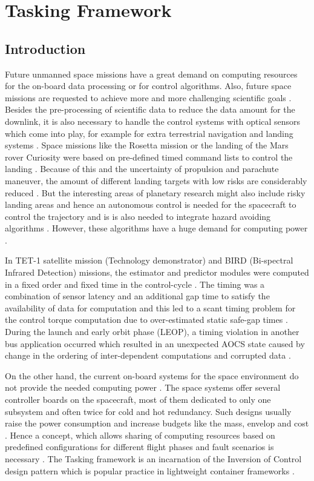 
\chapter{Tasking Framework}
\section{Introduction}
Future unmanned space missions have a great demand on computing resources for the on-board data processing or for control algorithms. Also, future space missions are requested to achieve more and more challenging scientific goals \cite{PhdThesis}. Besides the pre-processing of scientific data to reduce the data amount for the downlink, it is also necessary to handle the control systems with optical sensors which come into play, for example for extra terrestrial navigation and landing systems \cite{ATON}. Space missions like the Rosetta mission or the landing of the Mars rover Curiosity were based on pre-defined timed command lists to control the landing \cite{TaskFr}. Because of this and the uncertainty of propulsion and parachute maneuver, the amount of different landing targets with low risks are considerably reduced \cite{TaskFr}. But the interesting areas of planetary research might also include risky landing areas and hence an autonomous control is needed for the spacecraft to control the trajectory and is is also needed to integrate hazard avoiding algorithms \cite{ATON}. However, these algorithms have a huge demand for computing power \cite{TaskFr}. 

In TET-1 satellite mission (Technology demonstrator) and BIRD (Bi-spectral Infrared Detection) missions, the estimator and predictor modules were computed in a fixed order and fixed time in the control-cycle \cite{TETBIRD}. The timing was a combination of sensor latency and an additional gap time to satisfy the availability of data for computation and this led to a scant timing problem for the control torque computation due to over-estimated static safe-gap times \cite{TETBIRD,TETtoEUCROPIS}. During the launch and early orbit phase (LEOP), a timing violation in another bus application occurred which resulted in an unexpected AOCS state caused by change in the ordering of inter-dependent computations and corrupted data \cite{TETBIRD}.

On the other hand, the current on-board systems for the space environment do not provide the needed computing power \cite{TaskFr}. The space systems offer several controller boards on the spacecraft, most of them dedicated to only one subsystem and often twice for cold and hot redundancy. Such designs usually raise the power consumption and increase budgets like the mass, envelop and cost \cite{TaskFr}. Hence a concept, which allows sharing of computing resources based on predefined configurations for different flight phases and fault scenarios is necessary \cite{TaskFr}. The Tasking framework is an incarnation of the Inversion of Control design pattern which is popular practice in lightweight container frameworks \cite{InvOfCntrlurl}. 

